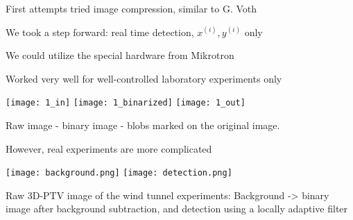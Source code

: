 \begin{frame}[label=real-5a]{First attempts tried image compression, similar to G. Voth}
    \centering{}
\end{frame}


\begin{frame}[label=real-6]{We took a step forward: real time detection, $x^{(i)},y^{(i)}$ only}
    \centering{}
\end{frame}


\begin{frame}[label=real-5b]{We could utilize the special hardware from Mikrotron }
    \begin{multicols*}{2}
    \end{multicols*}
    \centering {}
\end{frame}


\begin{frame}[label=real-7]{Worked very well for well-controlled laboratory experiments only}
    \begin{card}
    \centering
    \texttt{[image: 1\_in]}
    \texttt{[image: 1\_binarized]}
    \texttt{[image: 1\_out]}
    \end{card}
    \vspace{-.5cm}
    \begin{cardTiny}
    Raw image - binary image - blobs marked on the original image.  
    \end{cardTiny}
\end{frame}

\begin{frame}[label=real-8]{However, real experiments are more complicated}
    \begin{multicols}{2}
    \texttt{[image: background.png]}
    \texttt{[image: detection.png]}
    \end{multicols}
    \begin{cardTiny}
    Raw 3D-PTV image of the wind tunnel experiments: Background ->  binary image after background subtraction, and detection using a locally adaptive filter
    \end{cardTiny}
\end{frame}

